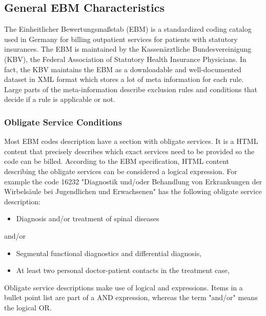 \subsection{General EBM Characteristics}\label{subsec:general-ebm-characteristics}
The Einheitlicher Bewertungsmaßstab (EBM) is a standardized coding catalog used in Germany for billing outpatient services for patients with statutory insurances.
The EBM is maintained by the Kassenärztliche Bundesvereinigung (KBV), the Federal Association of Statutory Health Insurance Physicians\cite[]{hermanns2015ebm}.
In fact, the KBV maintains the EBM as a downloadable and well-documented dataset in XML format which stores a lot of meta information for each rule.
Large parts of the meta-information describe exclusion rules and conditions that decide if a rule is applicable or not.


\subsubsection{Obligate Service Conditions}\label{subsubsec:obligate-service-conditions}
Most EBM codes description have a section with obligate services.
It is a HTML content that precisely describes which exact services need to be provided so the code can be billed.
According to the EBM specification, HTML content describing the obligate services can be considered a logical expression.
For example the code 16232 "Diagnostik und/oder Behandlung von Erkrankungen der Wirbelsäule bei Jugendlichen und Erwachsenen" has the following obligate service description:


\begin{itemize}
    \item Diagnosis and/or treatment of spinal diseases
\end{itemize}
and/or
\begin{itemize}
    \item Segmental functional diagnostics and differential diagnosis,
    \item At least two personal doctor-patient contacts in the treatment case,
\end{itemize}

Obligate service descriptions make use of logical  and  expressions.
Items in a bullet point list are part of a AND expression, whereas the term "and/or" means the logical OR.

